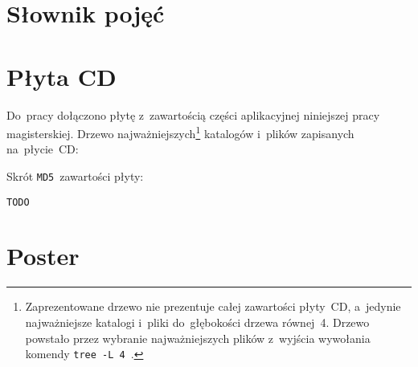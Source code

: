 \documentclass[thesis]{subfiles}
\begin{document}

\begin{appendices}


\makeatletter
{}
\makeatother


\chapter{Słownik pojęć}

\printglossary[style=labeling,title=Słownik pojęć]


\chapter{Płyta CD}
\label{ch:cd-appendix}

Do~pracy dołączono płytę z~zawartością części aplikacyjnej niniejszej pracy magisterskiej. Drzewo najważniejszych\footnote{Zaprezentowane drzewo nie prezentuje całej zawartości płyty~CD, a~jedynie najważniejsze katalogi i~pliki do~głębokości drzewa równej~4. Drzewo powstało przez wybranie najważniejszych plików z~wyjścia wywołania komendy \mbox{\texttt{tree~-L~4}}~\cite{tree-manual}.} katalogów i~plików zapisanych na~płycie~CD: %


\noindent Skrót \texttt{MD5}~zawartości płyty:
\begin{center}
\texttt{TODO}
\end{center}


\chapter{Poster}


\end{appendices}
\end{document}
